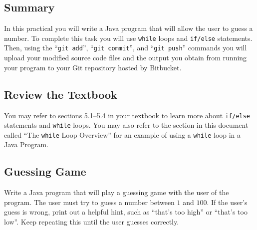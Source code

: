 



\subsection*{Summary}
\vspace*{-.05in}
In this practical you will write a Java program that will allow the user to guess a number. To complete this task you will use {\tt while} loops and {\tt if/else} statements.  Then, using the ``{\tt git add}'', ``{\tt git  commit}'', and ``{\tt git push}'' commands you will
upload your modified source code files and the output you obtain from running your program to your Git repository hosted
by Bitbucket.  

\vspace*{-.1in}
\subsection*{Review the Textbook}
\vspace*{-.05in}
You may refer to sections 5.1--5.4 in your textbook to learn more about
{\tt if/else} statements and {\tt while} loops.  You may also refer to
the section in this document called ``The {\tt while} Loop Overview''
for an example of using a {\tt while} loop in a Java Program.

\vspace*{-.1in}
\subsection*{Guessing Game}
\vspace*{-.05in}
Write a Java program that will play a guessing game with the user of the program.
The user must try to guess a number between $1$ and $100$. If the user's
guess is wrong, print out a helpful hint, such as ``that's too high'' or
``that's too low''. Keep repeating this until the user guesses correctly.

